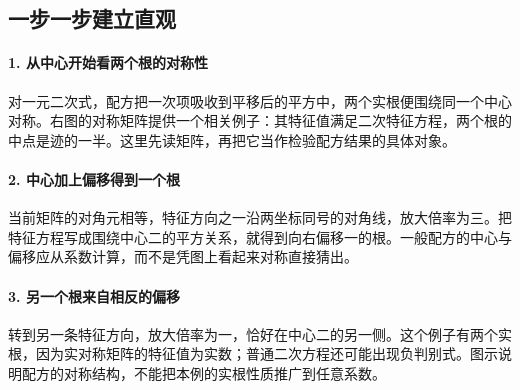 \subsection*{一步一步建立直观}

\paragraph{1. 从中心开始看两个根的对称性}

对一元二次式，配方把一次项吸收到平移后的平方中，两个实根便围绕同一个中心对称。右图的对称矩阵提供一个相关例子：其特征值满足二次特征方程，两个根的中点是迹的一半。这里先读矩阵，再把它当作检验配方结果的具体对象。



\paragraph{2. 中心加上偏移得到一个根}

当前矩阵的对角元相等，特征方向之一沿两坐标同号的对角线，放大倍率为三。把特征方程写成围绕中心二的平方关系，就得到向右偏移一的根。一般配方的中心与偏移应从系数计算，而不是凭图上看起来对称直接猜出。



\paragraph{3. 另一个根来自相反的偏移}

转到另一条特征方向，放大倍率为一，恰好在中心二的另一侧。这个例子有两个实根，因为实对称矩阵的特征值为实数；普通二次方程还可能出现负判别式。图示说明配方的对称结构，不能把本例的实根性质推广到任意系数。
